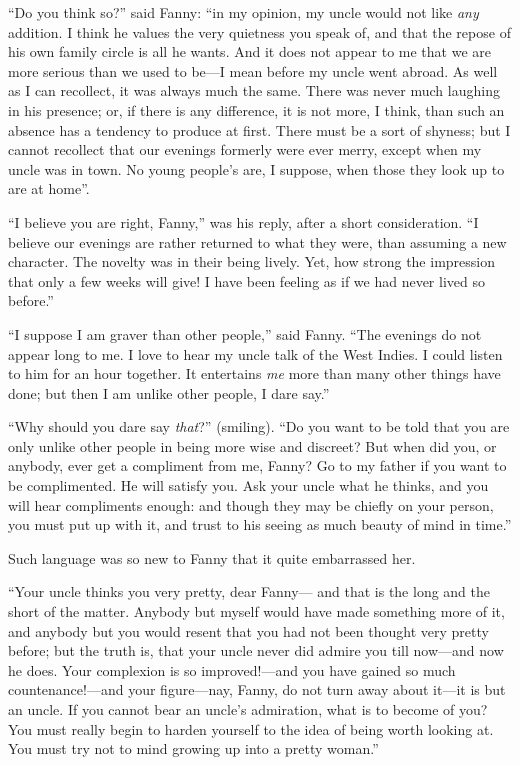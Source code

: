 \documentclass{article}
\begin{document}
``Do you think so?'' said Fanny:  ``in my opinion,
my uncle would not like \emph{any} addition.  I think he
values the very quietness you speak of, and that the
repose of his own family circle is all he wants.
And it does not appear to me that we are more serious
than we used to be---I mean before my uncle went abroad.
As well as I can recollect, it was always much the same.
There was never much laughing in his presence; or,
if there is any difference, it is not more, I think,
than such an absence has a tendency to produce at first.
There must be a sort of shyness; but I cannot recollect
that our evenings formerly were ever merry, except when
my uncle was in town.  No young people's are, I suppose,
when those they look up to are at home''.

``I believe you are right, Fanny,'' was his reply, after a
short consideration.  ``I believe our evenings are rather
returned to what they were, than assuming a new character.
The novelty was in their being lively.  Yet, how strong
the impression that only a few weeks will give!
I have been feeling as if we had never lived so before.''

``I suppose I am graver than other people,'' said Fanny.
``The evenings do not appear long to me.  I love to hear
my uncle talk of the West Indies.  I could listen to him
for an hour together.  It entertains \emph{me} more than many
other things have done; but then I am unlike other people,
I dare say.''

``Why should you dare say \emph{that}?'' (smiling). ``Do you
want to be told that you are only unlike other people
in being more wise and discreet?  But when did you,
or anybody, ever get a compliment from me, Fanny?
Go to my father if you want to be complimented.
He will satisfy you.  Ask your uncle what he thinks,
and you will hear compliments enough:  and though they
may be chiefly on your person, you must put up with it,
and trust to his seeing as much beauty of mind in time.''

Such language was so new to Fanny that it quite embarrassed her.

``Your uncle thinks you very pretty, dear Fanny---%
and that is the long and the short of the matter.
Anybody but myself would have made something more of it,
and anybody but you would resent that you had not been
thought very pretty before; but the truth is, that your
uncle never did admire you till now---and now he does.
Your complexion is so improved!---and you have gained
so much countenance!---and your figure---nay, Fanny, do not
turn away about it---it is but an uncle.  If you cannot
bear an uncle's admiration, what is to become of you?
You must really begin to harden yourself to the idea of
being worth looking at.  You must try not to mind growing
up into a pretty woman.''
\end{document}

